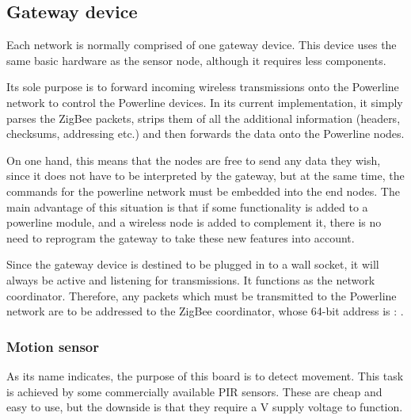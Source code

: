 \subsection{Gateway device}

Each network is normally comprised of one gateway device. This device uses the
same basic hardware as the sensor node, although it requires less components.


Its sole purpose is to forward incoming wireless transmissions onto the
Powerline network to control the Powerline devices. In its current
implementation, it simply parses the ZigBee packets, strips them of all the
additional information (headers, checksums, addressing etc.) and then forwards
the data onto the Powerline nodes.

On one hand, this means that the nodes are free to send any data they wish,
since it does not have to be interpreted by the gateway, but at the same time,
the commands for the powerline network must be embedded into the end nodes. The
main advantage of this situation is that if some functionality is added to a
powerline module, and a wireless node is added to complement it, there is no
need to reprogram the gateway to take these new features into account.

Since the gateway device is destined to be plugged in to a wall socket, it will
always be active and listening for transmissions. It functions as the network
coordinator. Therefore, any packets which must be transmitted to the Powerline
network are to be addressed to the ZigBee coordinator, whose 64-bit address is :
.

\subsubsection{Motion sensor}


As its name indicates, the purpose of this board is to detect movement. This
task is achieved by some commercially available PIR sensors. These are cheap and
easy to use, but the downside is that they require a \unit[5]{V} supply voltage
to function.

